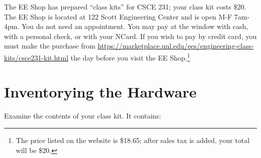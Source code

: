 The EE Shop has prepared ``class kits'' for CSCE 231; your class kit costs \$20.
The EE Shop is located at 122 Scott Engineering Center and is open M-F 7am-4pm.
You do not need an appointment. You may pay at the window with cash, with a
personal check, or with your NCard. If you wish to pay by credit card, you must
make the purchase from
\url{https://marketplace.unl.edu/ees/engineering-class-kits/csce231-kit.html}
the day before you visit the EE Shop.\footnote{The price listed on the website
is \$18.65; after sales tax is added, your total will be \$20.}

\section{Inventorying the Hardware} \label{inventory}

Examine the contents of your class kit. It contains:

